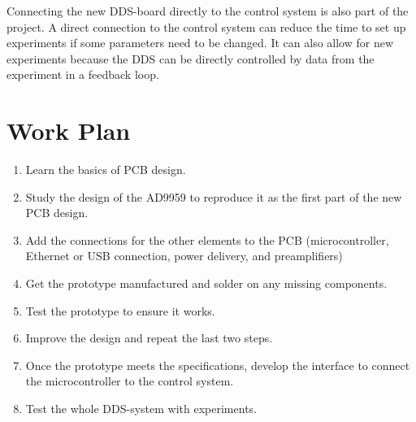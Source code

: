 \documentclass[10pt]{article}
\begin{document}
Connecting the new DDS-board directly to the control system is also part of the project. A direct connection to the control system can reduce the time to set up experiments if some parameters need to be changed. It can also allow for new experiments because the DDS can be directly controlled by data from the experiment in a feedback loop.


\newpage

\section*{Work Plan}

\begin{enumerate}
	\item Learn the basics of PCB design.

	\item Study the design of the AD9959 to reproduce it as the first part of the new PCB design.

	\item Add the connections for the other elements to the PCB (microcontroller, Ethernet or USB connection, power delivery, and preamplifiers)

	\item Get the prototype manufactured and solder on any missing components.

	\item Test the prototype to ensure it works.

	\item Improve the design and repeat the last two steps.

	\item Once the prototype meets the specifications, develop the interface to connect the microcontroller to the control system.

	\item Test the whole DDS-system with experiments. 

\end{enumerate}

\printbibliography[heading=bibintoc,title={Bibliography}]
\end{document}
